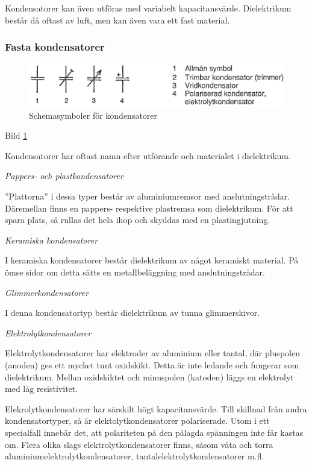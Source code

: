 Kondensatorer kan även utföras med variabelt kapacitansvärde. Dielektrikum
består då oftast av luft, men kan även vara ett fast material.

\subsubsection{Fasta kondensatorer}

\begin{figure}[h]
\includegraphics[width=\textwidth]{images/cropped_pdfs/bild_2_2-02.pdf}
\caption{Schemasymboler för kondensatorer}
\label{fig:BildII2-2}
\end{figure}

Bild \ref{fig:BildII2-2}

Kondensatorer har oftast namn efter utförande och materialet i dielektrikum.

\emph{Pappers- och plastkondensatorer}

''Plattorna'' i dessa typer består av aluminiumremsor med anslutningstrådar.
Däremellan finns en pappers- respektive plastremsa som dielektrikum. För att
spara plats, så rullas det hela ihop och skyddas med en plastingjutning.

\emph{Keramiska kondensatorer}

I keramiska kondensatorer består dielektrikum av något keramiskt material.
På ömse sidor om detta sätts en metallbeläggning med anslutningstrådar.

\emph{Glimmerkondensatorer}

I denna kondensatortyp består dielektrikum av tunna glimmerskivor.

\emph{Elektrolytkondensatorer}

Elektrolytkondensatorer har elektroder av aluminium eller tantal, där pluspolen
(anoden) ges ett mycket tunt oxidskikt. Detta är inte ledande och fungerar som
dielektrikum. Mellan oxidskiktet och minuspolen (katoden) läggs en elektrolyt
med låg resistivitet.

Elekrolytkondensatorer har särskilt högt kapacitansvärde. Till skillnad från
andra kondensatortyper, så är elektolytkondensatorer polariserade. Utom i ett
specialfall innebär det, att polariteten på den pålagda spänningen inte får
kastas om. Flera olika slags elektrolytkondensatorer finns, såsom våta
och torra aluminiumelektrolytkondensatorer, tantalelektrolytkondensatorer m.fl.

